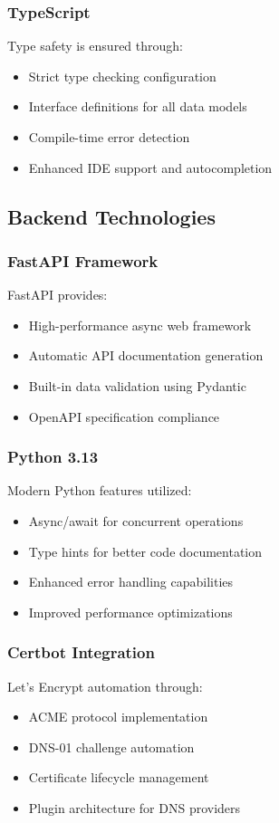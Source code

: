 \subsubsection{TypeScript}
Type safety is ensured through:
\begin{itemize}
    \item Strict type checking configuration
    \item Interface definitions for all data models
    \item Compile-time error detection
    \item Enhanced IDE support and autocompletion
\end{itemize}

\subsection{Backend Technologies}

\subsubsection{FastAPI Framework}
FastAPI provides:
\begin{itemize}
    \item High-performance async web framework
    \item Automatic API documentation generation
    \item Built-in data validation using Pydantic
    \item OpenAPI specification compliance
\end{itemize}

\subsubsection{Python 3.13}
Modern Python features utilized:
\begin{itemize}
    \item Async/await for concurrent operations
    \item Type hints for better code documentation
    \item Enhanced error handling capabilities
    \item Improved performance optimizations
\end{itemize}

\subsubsection{Certbot Integration}
Let's Encrypt automation through:
\begin{itemize}
    \item ACME protocol implementation
    \item DNS-01 challenge automation
    \item Certificate lifecycle management
    \item Plugin architecture for DNS providers
\end{itemize}

